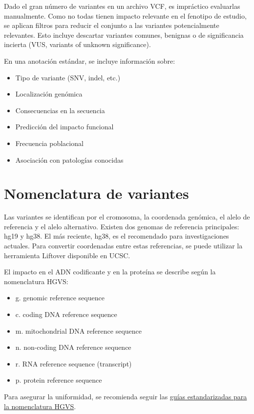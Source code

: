 Dado el gran número de variantes en un archivo VCF, es impráctico evaluarlas manualmente. Como no todas tienen impacto relevante en el fenotipo de estudio, se aplican filtros para reducir el conjunto a las variantes potencialmente relevantes. Esto incluye descartar variantes comunes, benignas o de significancia incierta (VUS, variants of unknown significance).

En una anotación estándar, se incluye información sobre:
\begin{itemize}
\item Tipo de variante (SNV, indel, etc.)
\item Localización genómica
\item Consecuencias en la secuencia
\item Predicción del impacto funcional
\item Frecuencia poblacional
\item Asociación con patologías conocidas
\end{itemize}

\section{Nomenclatura de variantes}
Las variantes se identifican por el cromosoma, la coordenada genómica, el alelo de referencia y el alelo alternativo. Existen dos genomas de referencia principales: hg19 y hg38. El más reciente, hg38, es el recomendado para investigaciones actuales. Para convertir coordenadas entre estas referencias, se puede utilizar la herramienta Liftover disponible en UCSC.

El impacto en el ADN codificante y en la proteína se describe según la nomenclatura HGVS:
\begin{itemize}
\item g. genomic reference sequence
\item c. coding DNA reference sequence
\item m. mitochondrial DNA reference sequence
\item n. non-coding DNA reference sequence
\item r. RNA reference sequence (transcript)
\item p. protein reference sequence
\end{itemize}

Para asegurar la uniformidad, se recomienda seguir las \href{https://hgvs-nomenclature.org/stable/recommendations/general/}{guías estandarizadas para la nomenclatura HGVS}.

